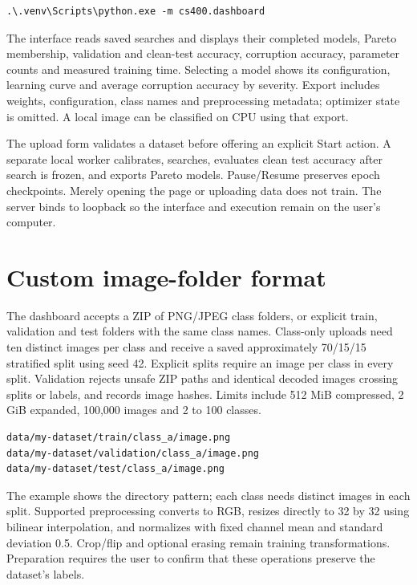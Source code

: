 \documentclass[11pt,a4paper,oneside]{report}
\begin{document}
\begin{lstlisting}
.\.venv\Scripts\python.exe -m cs400.dashboard
\end{lstlisting}

The interface reads saved searches and displays their completed models, Pareto membership, validation and clean-test accuracy, corruption accuracy, parameter counts and measured training time. Selecting a model shows its configuration, learning curve and average corruption accuracy by severity. Export includes weights, configuration, class names and preprocessing metadata; optimizer state is omitted. A local image can be classified on CPU using that export.

The upload form validates a dataset before offering an explicit Start action. A separate local worker calibrates, searches, evaluates clean test accuracy after search is frozen, and exports Pareto models. Pause/Resume preserves epoch checkpoints. Merely opening the page or uploading data does not train. The server binds to loopback so the interface and execution remain on the user's computer.

\section{Custom image-folder format}

The dashboard accepts a ZIP of PNG/JPEG class folders, or explicit train, validation and test folders with the same class names. Class-only uploads need ten distinct images per class and receive a saved approximately 70/15/15 stratified split using seed 42. Explicit splits require an image per class in every split. Validation rejects unsafe ZIP paths and identical decoded images crossing splits or labels, and records image hashes. Limits include 512 MiB compressed, 2 GiB expanded, 100,000 images and 2 to 100 classes.

\begin{lstlisting}
data/my-dataset/train/class_a/image.png
data/my-dataset/validation/class_a/image.png
data/my-dataset/test/class_a/image.png
\end{lstlisting}

The example shows the directory pattern; each class needs distinct images in each split. Supported preprocessing converts to RGB, resizes directly to 32 by 32 using bilinear interpolation, and normalizes with fixed channel mean and standard deviation 0.5. Crop/flip and optional erasing remain training transformations. Preparation requires the user to confirm that these operations preserve the dataset's labels.
\end{document}
